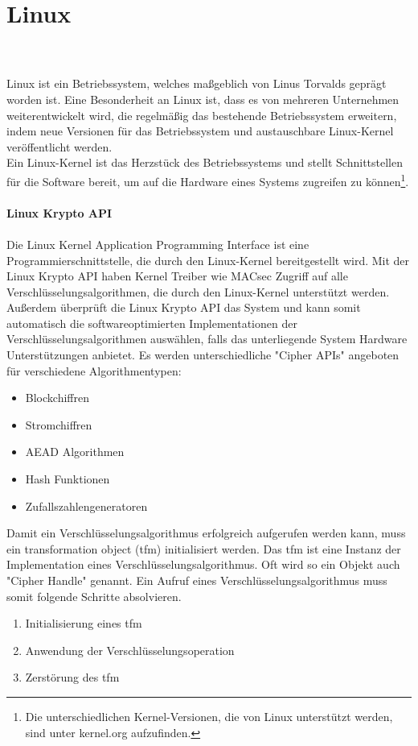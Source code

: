 \section{Linux}\\
\\ 
Linux ist ein Betriebssystem, welches maßgeblich von Linus Torvalds geprägt worden ist. Eine Besonderheit an Linux ist, dass es von mehreren Unternehmen weiterentwickelt wird, die regelmäßig das bestehende Betriebssystem erweitern, indem neue Versionen für das Betriebssystem und austauschbare Linux-Kernel veröffentlicht werden.\\
Ein Linux-Kernel ist das Herzstück des Betriebssystems und stellt Schnittstellen für die Software bereit, um auf die Hardware eines Systems zugreifen zu können\footnote[17]{Die unterschiedlichen Kernel-Versionen, die von Linux unterstützt werden, sind unter kernel.org aufzufinden.}.\\
\\
\textbf{Linux Krypto API}
\\
\\
Die Linux Kernel Application Programming Interface ist eine Programmierschnittstelle, die durch den Linux-Kernel bereitgestellt wird. Mit der Linux Krypto API haben Kernel Treiber wie MACsec Zugriff auf alle Verschlüsselungsalgorithmen, die durch den Linux-Kernel unterstützt werden. Außerdem überprüft die Linux Krypto API das System und kann somit automatisch die softwareoptimierten Implementationen der Verschlüsselungsalgorithmen auswählen, falls das unterliegende System Hardware Unterstützungen anbietet. Es werden unterschiedliche "{}Cipher APIs"{} angeboten für verschiedene Algorithmentypen:
\begin{itemize}
\item Blockchiffren
\item Stromchiffren
\item AEAD Algorithmen
\item Hash Funktionen
\item Zufallszahlengeneratoren
\end{itemize} Damit ein Verschlüsselungsalgorithmus erfolgreich aufgerufen werden kann, muss ein transformation object (tfm) initialisiert werden. Das tfm ist eine Instanz der Implementation eines Verschlüsselungsalgorithmus.
Oft wird so ein Objekt auch "{}Cipher Handle{}" genannt.
Ein Aufruf eines Verschlüsselungsalgorithmus muss somit folgende Schritte absolvieren. 
\begin{enumerate}
\item Initialisierung eines tfm
\item Anwendung der Verschlüsselungsoperation
\item Zerstörung des tfm
\end{enumerate}

